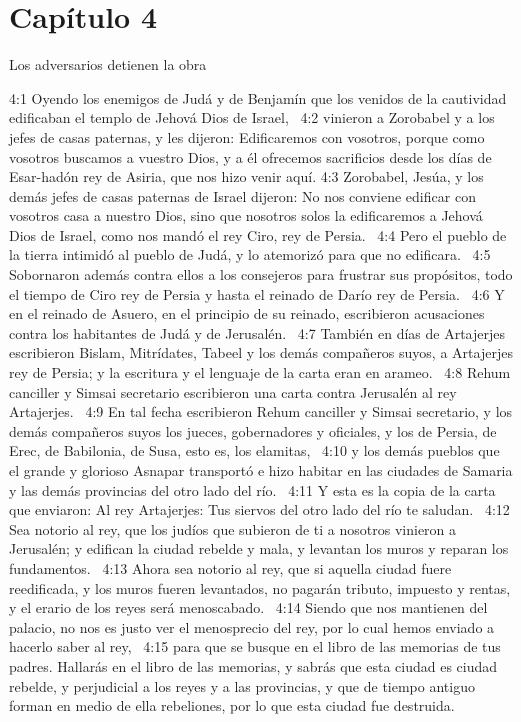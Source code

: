 \section*{Capítulo 4}
Los adversarios detienen la obra  

4:1 Oyendo los enemigos de Judá y de Benjamín que los venidos de la cautividad edificaban el templo de Jehová Dios de Israel,  
4:2 vinieron a Zorobabel y a los jefes de casas paternas, y les dijeron: Edificaremos con vosotros, porque como vosotros buscamos a vuestro Dios, y a él ofrecemos sacrificios desde los días de Esar-hadón rey de Asiria, que nos hizo venir aquí. 
4:3 Zorobabel, Jesúa, y los demás jefes de casas paternas de Israel dijeron: No nos conviene edificar con vosotros casa a nuestro Dios, sino que nosotros solos la edificaremos a Jehová Dios de Israel, como nos mandó el rey Ciro, rey de Persia.  
4:4 Pero el pueblo de la tierra intimidó al pueblo de Judá, y lo atemorizó para que no edificara.  
4:5 Sobornaron además contra ellos a los consejeros para frustrar sus propósitos, todo el tiempo de Ciro rey de Persia y hasta el reinado de Darío rey de Persia.  
4:6 Y en el reinado de Asuero, en el principio de su reinado, escribieron acusaciones contra los habitantes de Judá y de Jerusalén.  
4:7 También en días de Artajerjes escribieron Bislam, Mitrídates, Tabeel y los demás compañeros suyos, a Artajerjes rey de Persia; y la escritura y el lenguaje de la carta eran en arameo.  
4:8 Rehum canciller y Simsai secretario escribieron una carta contra Jerusalén al rey Artajerjes.  
4:9 En tal fecha escribieron Rehum canciller y Simsai secretario, y los demás compañeros suyos los jueces, gobernadores y oficiales, y los de Persia, de Erec, de Babilonia, de Susa, esto es, los elamitas,  
4:10 y los demás pueblos que el grande y glorioso Asnapar transportó e hizo habitar en las ciudades de Samaria y las demás provincias del otro lado del río.  
4:11 Y esta es la copia de la carta que enviaron: Al rey Artajerjes: Tus siervos del otro lado del río te saludan.  
4:12 Sea notorio al rey, que los judíos que subieron de ti a nosotros vinieron a Jerusalén; y edifican la ciudad rebelde y mala, y levantan los muros y reparan los fundamentos.  
4:13 Ahora sea notorio al rey, que si aquella ciudad fuere reedificada, y los muros fueren levantados, no pagarán tributo, impuesto y rentas, y el erario de los reyes será menoscabado.  
4:14 Siendo que nos mantienen del palacio, no nos es justo ver el menosprecio del rey, por lo cual hemos enviado a hacerlo saber al rey,  
4:15 para que se busque en el libro de las memorias de tus padres. Hallarás en el libro de las memorias, y sabrás que esta ciudad es ciudad rebelde, y perjudicial a los reyes y a las provincias, y que de tiempo antiguo forman en medio de ella rebeliones, por lo que esta ciudad fue destruida.  
